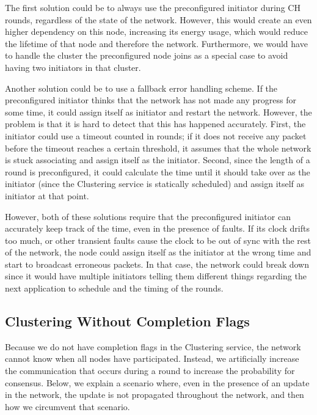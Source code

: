 The first solution could be to always use the preconfigured initiator during CH rounds, regardless of the state of the network. However, this would create an even higher dependency on this node, increasing its energy usage, which would reduce the lifetime of that node and therefore the network. Furthermore, we would have to handle the cluster the preconfigured node joins as a special case to avoid having two initiators in that cluster.

Another solution could be to use a fallback error handling scheme. If the preconfigured initiator thinks that the network has not made any progress for some time, it could assign itself as initiator and restart the network. However, the problem is that it is hard to detect that this has happened accurately. First, the initiator could use a timeout counted in rounds; if it does not receive any packet before the timeout reaches a certain threshold, it assumes that the whole network is stuck associating and assign itself as the initiator. Second, since the length of a round is preconfigured, it could calculate the time until it should take over as the initiator (since the Clustering service is statically scheduled) and assign itself as initiator at that point.

However, both of these solutions require that the preconfigured initiator can accurately keep track of the time, even in the presence of faults. If its clock drifts too much, or other transient faults cause the clock to be out of sync with the rest of the network, the node could assign itself as the initiator at the wrong time and start to broadcast erroneous packets. In that case, the network could break down since it would have multiple initiators telling them different things regarding the next application to schedule and the timing of the rounds.


\subsection{Clustering Without Completion Flags}
\label{subsec:discussion-clustering-without-completion-flags}
Because we do not have completion flags in the Clustering service, the network cannot know when all nodes have participated. Instead, we artificially increase the communication that occurs during a round to increase the probability for consensus. Below, we explain a scenario where, even in the presence of an update in the network, the update is not propagated throughout the network, and then how we circumvent that scenario.

